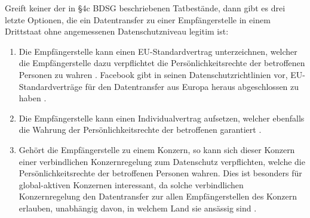 \par
Greift keiner der in §4c BDSG beschriebenen Tatbestände, dann gibt es drei letzte Optionen, die ein Datentransfer zu einer Empfängerstelle in einem Drittstaat ohne angemessenen Datenschutzniveau legitim ist:
\begin{enumerate}
	\item Die Empfängerstelle kann einen EU-Standardvertrag unterzeichnen, welcher die Empfängerstelle dazu verpflichtet die Persönlichkeitsrechte der betroffenen Personen zu wahren \autocite[vgl.][]{LDI.2017}. Facebook gibt in seinen Datenschutzrichtlinien vor, EU-Standardverträge für den Datentransfer aus Europa heraus abgeschlossen zu haben \autocite[vgl.][]{FacebookInc..2017}.
	 
	\item Die Empfängerstelle kann einen Individualvertrag aufsetzen, welcher ebenfalls die Wahrung der Persönlichkeitsrechte der betroffenen garantiert \autocite[vgl.][]{LDI.2017}.
	
	\item Gehört die Empfängerstelle zu einem Konzern, so kann sich dieser Konzern einer verbindlichen Konzernregelung zum Datenschutz verpflichten, welche die Persönlichkeitsrechte der betroffenen Personen wahren. Dies ist besonders für global-aktiven Konzernen interessant, da solche verbindlichen Konzernregelung den Datentransfer zur allen Empfängerstellen des Konzern erlauben, unabhängig davon, in welchem Land sie ansässig sind \autocite[vgl.][]{LDI.2017}.
\end{enumerate}


